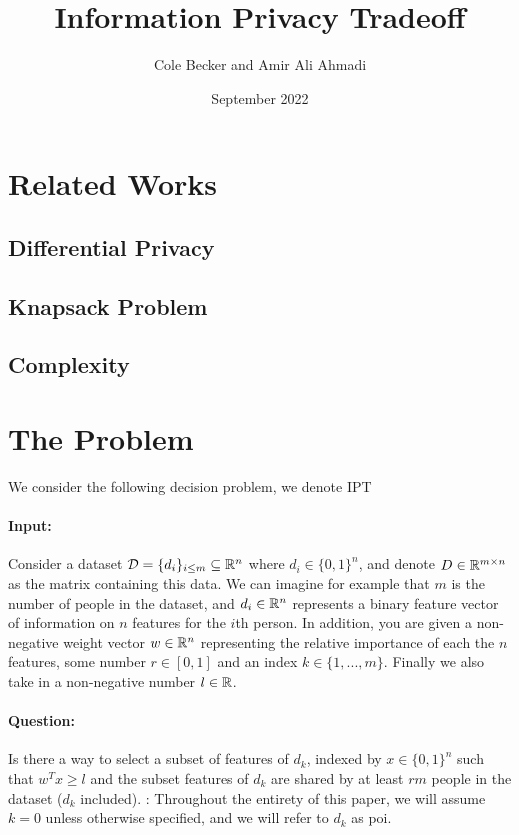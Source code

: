 \documentclass[12pt]{article}
\begin{document}
\title{Information Privacy Tradeoff}
\author{Cole Becker and Amir Ali Ahmadi}
\date{September 2022}
\maketitle

\section{Related Works}
\subsection{Differential Privacy}
\subsection{Knapsack Problem}
\subsection{Complexity}

\section{The Problem}
We consider the following decision problem, we denote \gls{IPT}
\paragraph{Input:}
Consider a dataset $\mathcal{D} = \{d_i\}_{i\leq m} \subseteq \mathbb{R}^n$ where $d_i \in \{0,1\}^n$, and denote $D\in \mathbb{R}^{m\times n}$ as the matrix containing this data. We can imagine for example that $m$ is the number of people in the dataset, and $d_i\in \mathbb{R}^n$ represents a binary feature vector of information on $n$ features for the $i$th person. In addition, you are given a non-negative weight vector $w\in \mathbb{R}^n$ representing the relative importance of each the $n$ features, some number $r \in [0,1]$ and an index $k \in \{1,...,m\}$. Finally we also take in a non-negative number $l \in \mathbb{R}$.
\paragraph{Question:}
Is there a way to select a subset of features of $d_k$, indexed by $x\in \{0,1\}^n$ such that $w^T x \geq l$ and the subset features of $d_k$ are shared by at least $rm$ people in the dataset ($d_k$ included). : Throughout the entirety of this paper, we will assume $k = 0$ unless otherwise specified, and we will refer to $d_k$ as \gls{poi}.
\end{document}
